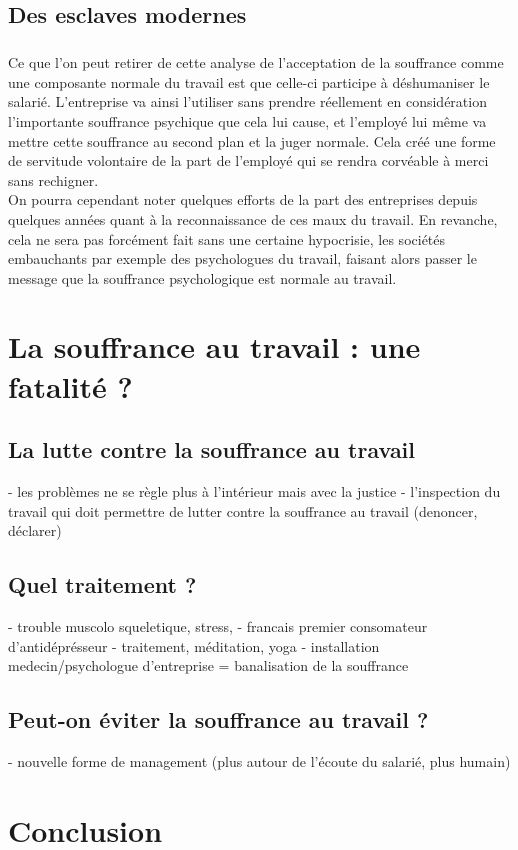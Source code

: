 \documentclass{report}
\begin{document}
	\section*{Des esclaves modernes}
		\paragraph{}
			Ce que l'on peut retirer de cette analyse de l'acceptation de la souffrance comme une composante normale du travail est que celle-ci participe à déshumaniser le salarié. L'entreprise va ainsi l'utiliser sans prendre réellement en considération l'importante souffrance psychique que cela lui cause, et l'employé lui même va mettre cette souffrance au second plan et la juger normale. Cela créé une forme de servitude volontaire de la part de l'employé qui se rendra corvéable à merci sans rechigner. \\
			On pourra cependant noter quelques efforts de la part des entreprises depuis quelques années quant à la reconnaissance de ces maux du travail. En revanche, cela ne sera pas forcément fait sans une certaine hypocrisie, les sociétés embauchants par exemple des psychologues du travail, faisant alors passer le message que la souffrance psychologique est normale au travail.

\chapter{La souffrance au travail : une fatalité ?}
	\section{La lutte contre la souffrance au travail}
		- les problèmes ne se règle plus à l'intérieur mais avec la justice
		- l'inspection du travail qui doit permettre de lutter contre la souffrance au travail (denoncer, déclarer)
	\section{Quel traitement ?}
		- trouble muscolo squeletique, stress, 
		- francais premier consomateur d'antidéprésseur
		- traitement, méditation, yoga
		- installation medecin/psychologue d'entreprise = banalisation de la souffrance
	\section{Peut-on éviter la souffrance au travail ?}
    	- nouvelle forme de management (plus autour de l'écoute du salarié, plus humain)
\chapter*{Conclusion}
    \paragraph*{}
         
\end{document}
